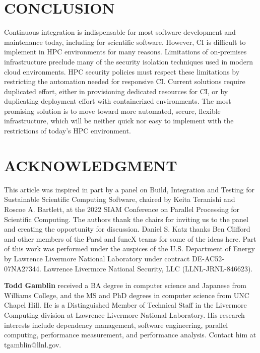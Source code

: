 \documentclass{IEEEcsmag}
\begin{document}
\section{CONCLUSION}

Continuous integration is indispensable for most software development and
maintenance today, including for scientific software.
However, CI is difficult to implement in HPC environments for many reasons.
Limitations of on-premises infrastructure preclude many of the security isolation
techniques used in modern cloud environments. HPC security policies must respect these
limitations by restricting the automation needed for responsive CI. Current solutions
require duplicated effort, either in provisioning dedicated resources for CI, or by
duplicating deployment effort with containerized environments. The most promising
solution is to move toward more automated, secure, flexible infrastructure,
which will be
neither quick nor easy to implement with the restrictions of today's HPC environment.

\section{ACKNOWLEDGMENT}

This article was inspired in part by a panel on Build, Integration and Testing for
Sustainable Scientific Computing Software, chaired by Keita Teranishi and Roscoe A.
Bartlett, at the 2022 SIAM Conference on Parallel Processing for Scientific Computing.
The authors thank the chairs for inviting us to the panel and creating the opportunity
for discussion. Daniel S. Katz thanks Ben Clifford and other members of the Parsl and
funcX teams for some of the ideas here. Part of this work was performed under the
auspices of the U.S. Department of Energy by Lawrence Livermore National Laboratory
under contract DE-AC52-07NA27344. Lawrence Livermore National Security, LLC
(LLNL-JRNL-846623).




\bigskip

\textbf{Todd Gamblin} received a BA degree in computer science and Japanese from Williams College, and the MS and PhD degrees in computer science from UNC Chapel Hill. He is a Distinguished Member of Technical Staff in the Livermore Computing division at Lawrence Livermore National Laboratory. His research interests include dependency management, software engineering, parallel computing, performance measurement, and performance analysis.
Contact him at tgamblin@llnl.gov.
\end{document}
